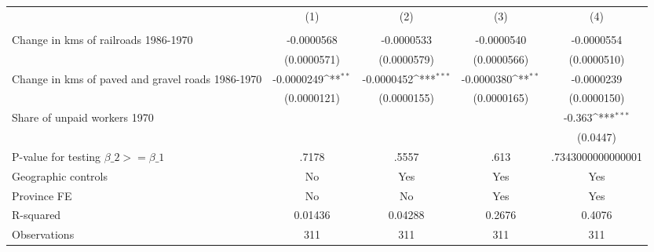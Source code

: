 {
\def\sym#1{\ifmmode^{#1}\else\(^{#1}\)\fi}
\begin{tabular}{l*{4}{c}}
\hline\hline
                &\multicolumn{1}{c}{(1)}&\multicolumn{1}{c}{(2)}&\multicolumn{1}{c}{(3)}&\multicolumn{1}{c}{(4)}\\
                &\multicolumn{1}{c}{}&\multicolumn{1}{c}{}&\multicolumn{1}{c}{}&\multicolumn{1}{c}{}\\
\hline
Change in kms of railroads 1986-1970&-0.0000568         &-0.0000533         &-0.0000540         &-0.0000554         \\
                &(0.0000571)         &(0.0000579)         &(0.0000566)         &(0.0000510)         \\
[1em]
Change in kms of paved and gravel roads 1986-1970&-0.0000249\sym{**} &-0.0000452\sym{***}&-0.0000380\sym{**} &-0.0000239         \\
                &(0.0000121)         &(0.0000155)         &(0.0000165)         &(0.0000150)         \\
[1em]
Share of unpaid workers 1970&                  &                  &                  &   -0.363\sym{***}\\
                &                  &                  &                  & (0.0447)         \\
\hline
P-value for testing $\beta\_{2} >= \beta\_{1}$&    .7178         &    .5557         &     .613         &.7343000000000001         \\
Geographic controls&       No         &      Yes         &      Yes         &      Yes         \\
Province FE     &       No         &       No         &      Yes         &      Yes         \\
R-squared       &  0.01436         &  0.04288         &   0.2676         &   0.4076         \\
Observations    &      311         &      311         &      311         &      311         \\
\hline\hline
\end{tabular}
}
